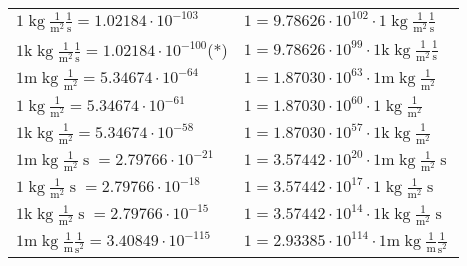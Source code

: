 \begin{center}
\begin{longtable}{l l}
{\color{black}$1 \bm{\mathrm{ }}\operatorname{kg}\frac1{\operatorname{m}^2}\frac1{\operatorname{s}}{}{} = 1.02184\cdot10^{-103} $}   & {\color{black}$ 1 = 9.78626\cdot10^{102} \cdot 1 \bm{\mathrm{ }}\operatorname{kg}\frac1{\operatorname{m}^2}\frac1{\operatorname{s}}{}{}$}  \\
{\color{gray}$1 \bm{\mathrm{ k}}\operatorname{kg}\frac1{\operatorname{m}^2}\frac1{\operatorname{s}}{}{} = 1.02184\cdot10^{-100} $}\quad(*) & {\color{gray}$ 1 = 9.78626\cdot10^{99} \cdot 1 \bm{\mathrm{ k}}\operatorname{kg}\frac1{\operatorname{m}^2}\frac1{\operatorname{s}}{}{}$}  \\
{\color{gray}$1 \bm{\mathrm{ m}}\operatorname{kg}\frac1{\operatorname{m}^2}{}{}{} = 5.34674\cdot10^{-64} $}   & {\color{gray}$ 1 = 1.87030\cdot10^{63} \cdot 1 \bm{\mathrm{ m}}\operatorname{kg}\frac1{\operatorname{m}^2}{}{}{}$}  \\
{\color{black}$1 \bm{\mathrm{ }}\operatorname{kg}\frac1{\operatorname{m}^2}{}{}{} = 5.34674\cdot10^{-61} $}   & {\color{black}$ 1 = 1.87030\cdot10^{60} \cdot 1 \bm{\mathrm{ }}\operatorname{kg}\frac1{\operatorname{m}^2}{}{}{}$}  \\
{\color{gray}$1 \bm{\mathrm{ k}}\operatorname{kg}\frac1{\operatorname{m}^2}{}{}{} = 5.34674\cdot10^{-58} $}   & {\color{gray}$ 1 = 1.87030\cdot10^{57} \cdot 1 \bm{\mathrm{ k}}\operatorname{kg}\frac1{\operatorname{m}^2}{}{}{}$}  \\
{\color{gray}$1 \bm{\mathrm{ m}}\operatorname{kg}\frac1{\operatorname{m}^2}{\operatorname{s}}{}{} = 2.79766\cdot10^{-21} $}   & {\color{gray}$ 1 = 3.57442\cdot10^{20} \cdot 1 \bm{\mathrm{ m}}\operatorname{kg}\frac1{\operatorname{m}^2}{\operatorname{s}}{}{}$}  \\
{\color{black}$1 \bm{\mathrm{ }}\operatorname{kg}\frac1{\operatorname{m}^2}{\operatorname{s}}{}{} = 2.79766\cdot10^{-18} $}   & {\color{black}$ 1 = 3.57442\cdot10^{17} \cdot 1 \bm{\mathrm{ }}\operatorname{kg}\frac1{\operatorname{m}^2}{\operatorname{s}}{}{}$}  \\
{\color{gray}$1 \bm{\mathrm{ k}}\operatorname{kg}\frac1{\operatorname{m}^2}{\operatorname{s}}{}{} = 2.79766\cdot10^{-15} $}   & {\color{gray}$ 1 = 3.57442\cdot10^{14} \cdot 1 \bm{\mathrm{ k}}\operatorname{kg}\frac1{\operatorname{m}^2}{\operatorname{s}}{}{}$}  \\
{\color{gray}$1 \bm{\mathrm{ m}}\operatorname{kg}\frac1{\operatorname{m}}\frac1{\operatorname{s}^2}{}{} = 3.40849\cdot10^{-115} $}   & {\color{gray}$ 1 = 2.93385\cdot10^{114} \cdot 1 \bm{\mathrm{ m}}\operatorname{kg}\frac1{\operatorname{m}}\frac1{\operatorname{s}^2}{}{}$}  \\

\end{longtable}
\end{center}
